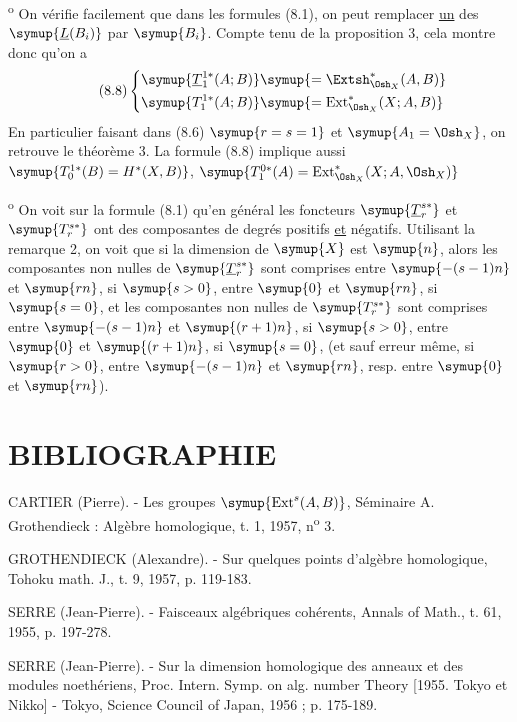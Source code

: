 \medskip
{}\textsuperscript{o} On vérifie facilement que dans les formules
(8.1), on peut remplacer \uline{un} des $\symup{\underline{L}(B_i)}$ par $\symup{B_i}$. Compte tenu de la
proposition 3, cela montre donc qu'on a
\begin{equation}\tag{8.8}
\left\{
\begin{aligned}\symup{\underline{T}_{1}^{1*}(A;B)}&\symup{=\Extsh_{\Osh_X}^{*}(A,B)}\\\symup{T_{1}^{1*}(A;B)}&\symup{=\operatorname{Ext}_{\Osh_X}^{*}(X;A,B)}\end{aligned}
\right.
\end{equation}
En particulier faisant dans (8.6) $\symup{r=s=1}$ et $\symup{A_1=\Osh_X}$, on retrouve le
théorème 3. La formule (8.8) implique aussi
$\symup{T_{0}^{1*}(B)=H^{*}(X,B)}$, $\symup{T_{1}^{0*}(A)=\operatorname{Ext}_{\Osh_X}^{*}(X;A,\Osh_X)}$

\medskip
{}\textsuperscript{o} On voit sur la formule (8.1) qu'en général les
foncteurs $\symup{\underline{T}_{r}^{s*}}$ et $\symup{T_{r}^{s*}}$ ont des composantes de
degrés positifs \uline{et} négatifs. Utilisant la remarque 2, on voit que si la
dimension de $\symup{X}$ est $\symup{n}$, alors les composantes non nulles de
$\symup{\underline{T}_{r}^{s*}}$ sont comprises entre $\symup{-(s-1)n}$ et $\symup{rn}$, si $\symup{s>0}$,
entre $\symup{0}$ et $\symup{rn}$, si $\symup{s=0}$, et les composantes non nulles de $\symup{T_{r}^{s*}}$
sont comprises entre $\symup{-(s-1)n}$ et $\symup{(r+1)n}$, si $\symup{s>0}$, entre $\symup{0}$ et $\symup{(r+1)n}$,
si $\symup{s=0}$, (et sauf erreur même, si $\symup{r>0}$, entre $\symup{-(s-1)n}$ et $\symup{rn}$, resp. entre
$\symup{0}$ et $\symup{rn}$).

\section*{\centering\normalfont BIBLIOGRAPHIE}

\noindent[1] CARTIER (Pierre). - Les groupes
$\symup{\operatorname{Ext}^{s}(A,B)}$, Séminaire A. Grothendieck : Algèbre homologique,
t. 1, 1957, n\textsuperscript{o} 3.

\noindent[2] GROTHENDIECK (Alexandre). - Sur quelques points d'algèbre
homologique, Tohoku math. J., t. 9, 1957, p. 119-183.

\noindent[3] SERRE (Jean-Pierre). - Faisceaux algébriques cohérents,
Annals of Math., t. 61, 1955, p. 197-278.

\noindent[4] SERRE (Jean-Pierre). - Sur la dimension homologique des anneaux
et des modules noethériens, Proc. Intern. Symp. on alg. number Theory
[1955. Tokyo et Nikko] - Tokyo, Science Council of Japan, 1956 ;
p. 175-189.

